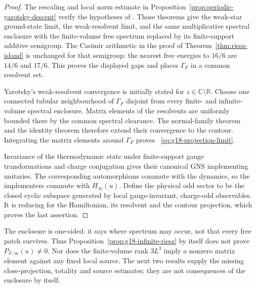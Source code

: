 \begin{proof}
The rescaling and local norm estimate in
Proposition~\ref{prop:periodic-yarotsky-descent} verify the hypotheses of
\cite[Theorems~2 and~3]{Yarotsky2004QP}.  Those theorems give the weak-star
ground-state limit, the weak-resolvent limit, and the same multiplicative
spectral enclosure with the finite-volume free spectrum replaced by its
finite-support additive semigroup.  The Casimir arithmetic in the proof of
Theorem~\ref{thm:riesz-island} is unchanged for that semigroup: the nearest
free energies to $16/6$ are $14/6$ and $17/6$.  This proves the displayed
gaps and places $\Gamma_F$ in a common resolvent set.

Yarotsky's weak-resolvent convergence is initially stated for
$z\in\mathbb C\setminus\mathbb R$.  Choose one connected tubular
neighbourhood of $\Gamma_F$ disjoint from every finite- and infinite-volume
spectral enclosure.  Matrix elements of the resolvents are uniformly bounded
there by the common spectral clearance.  The normal-family theorem and the
identity theorem therefore extend their convergence to the contour.
Integrating the matrix elements around $\Gamma_F$ proves
~\eqref{eq:g18-projection-limit}.

Invariance of the thermodynamic state under finite-support gauge
transformations and charge conjugation gives their canonical GNS
implementing unitaries.  The corresponding automorphisms commute with the
dynamics, so the implementers commute with $H_\infty(u)$.  Define the physical
odd sector to be the closed cyclic subspace generated by local
gauge-invariant, charge-odd observables.  It is reducing for the Hamiltonian,
its resolvent and the contour projection, which proves the last assertion.
\end{proof}

\begin{remark}
\label{rem:g18-projection-may-vanish}
The enclosure is one-sided: it says where spectrum may occur, not that every
free patch survives.  Thus Proposition~\ref{prop:g18-infinite-riesz} by
itself does not prove $P_{F,\infty}(u)\ne0$.  Nor does the finite-volume rank
$3L^3$ imply a nonzero matrix element against any fixed local source.  The
next two results supply the missing close-projection, totality and source
estimates; they are not consequences of the enclosure by itself.
\end{remark}



